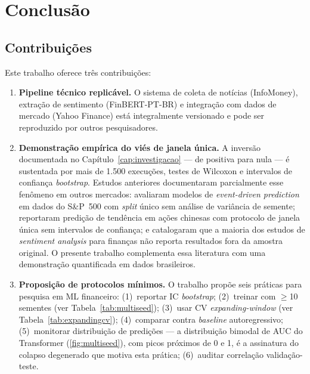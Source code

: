 \chapter{Conclusão}\label{cap:conclusao}

\section{Contribuições}

Este trabalho oferece três contribuições:

\begin{enumerate}
    \item \textbf{Pipeline técnico replicável.} O sistema de coleta de notícias (InfoMoney), extração de sentimento (FinBERT-PT-BR) e integração com dados de mercado (Yahoo Finance) está integralmente versionado e pode ser reproduzido por outros pesquisadores.

    \item \textbf{Demonstração empírica do viés de janela única.} A inversão documentada no Capítulo~\ref{cap:investigacao} --- de positiva para nula --- é sustentada por mais de 1.500 execuções, testes de Wilcoxon e intervalos de confiança \textit{bootstrap}. Estudos anteriores documentaram parcialmente esse fenômeno em outros mercados:  avaliaram modelos de \textit{event-driven prediction} em dados do S\&P~500 com \textit{split} único sem análise de variância de semente;  reportaram predição de tendência em ações chinesas com protocolo de janela única sem intervalos de confiança; e  catalogaram que a maioria dos estudos de \textit{sentiment analysis} para finanças não reporta resultados fora da amostra original. O presente trabalho complementa essa literatura com uma demonstração quantificada em dados brasileiros.

    \item \textbf{Proposição de protocolos mínimos.} O trabalho propõe seis práticas para pesquisa em ML financeiro: (1)~reportar IC \textit{bootstrap}; (2)~treinar com $\geq$10 sementes (ver Tabela~\ref{tab:multiseed}); (3)~usar CV \textit{expanding-window} (ver Tabela~\ref{tab:expandingcv}); (4)~comparar contra \textit{baseline} autoregressivo; (5)~monitorar distribuição de predições --- a distribuição bimodal de AUC do Transformer (\autoref{fig:multiseed}), com picos próximos de 0 e 1, é a assinatura do colapso degenerado que motiva esta prática; (6)~auditar correlação validação-teste.
\end{enumerate}

